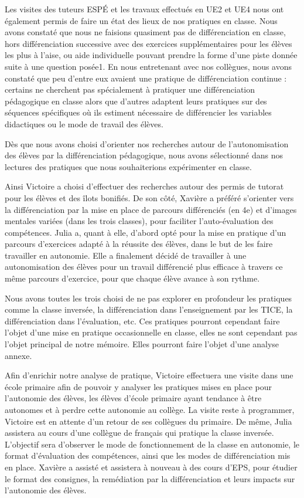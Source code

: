 Les visites des tuteurs ESPÉ et les travaux effectués en UE2 et UE4 nous ont également permis de faire un état des lieux de nos pratiques en classe. Nous avons constaté que nous ne faisions quasiment pas de différenciation en classe, hors différenciation successive avec des exercices supplémentaires pour les élèves les plus à l’aise, ou aide individuelle pouvant prendre la forme d’une piste donnée suite à une question posée1. 
En nous entretenant avec nos collègues, nous avons constaté que peu d’entre eux avaient une pratique de différenciation continue : certains ne cherchent pas spécialement à pratiquer une différenciation pédagogique en classe alors que d’autres adaptent leurs pratiques sur des séquences spécifiques où ils estiment nécessaire de différencier les variables didactiques ou le mode de travail des élèves.

Dès que nous avons choisi d’orienter nos recherches autour de l’autonomisation des élèves par la différenciation pédagogique, nous avons sélectionné dans nos lectures des pratiques que nous souhaiterions expérimenter en classe. 

Ainsi Victoire a choisi d’effectuer des recherches autour des permis de tutorat pour les élèves et des îlots bonifiés. De son côté, Xavière a préféré s’orienter vers la différenciation par la mise en place de parcours différenciés (en 4e) et d’images mentales variées (dans les trois classes), pour faciliter l’auto-évaluation des compétences. Julia a, quant à elle, d’abord opté pour la mise en pratique d’un parcours d’exercices adapté à la réussite des élèves, dans le but de les faire travailler en autonomie. Elle a finalement décidé de travailler à une autonomisation des élèves pour un travail différencié plus efficace à travers ce même parcours d’exercice, pour que chaque élève avance à son rythme. 


Nous avons toutes les trois choisi de ne pas explorer en profondeur les pratiques comme la classe inversée, la différenciation dans l’enseignement par les TICE, la différenciation dans l’évaluation, etc. Ces pratiques pourront cependant faire l’objet d’une mise en pratique occasionnelle en classe, elles ne sont cependant pas l’objet principal de notre mémoire. Elles pourront faire l’objet d’une analyse annexe.

Afin d’enrichir notre analyse de pratique, Victoire effectuera une visite dans une école primaire afin de pouvoir y analyser les pratiques mises en place pour l’autonomie des élèves, les élèves d’école primaire ayant tendance à être autonomes et à perdre cette autonomie au collège.  La visite reste à programmer, Victoire est en attente d’un retour de ses collègues du primaire. De même, Julia assistera au cours d’une collègue de français qui pratique la classe inversée. L’objectif sera d’observer le mode de fonctionnement de la classe en autonomie, le format d’évaluation des compétences, ainsi que les modes de différenciation mis en place. Xavière a assisté et assistera à nouveau à des cours d’EPS, pour étudier le format des consignes, la remédiation par la différenciation et leurs impacts sur l’autonomie des élèves.

